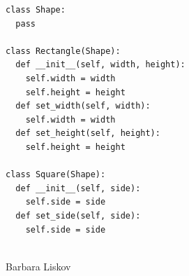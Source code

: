 \documentclass[calcdimensions,landscape,letterpaper]{powersem}
\newcommand{\thecurrentheading}{}
\newcommand{\heading}[1]{\renewcommand{\thecurrentheading}{#1}}
\begin{document}
\begin{slide}
  \heading{Liskov-Substitution - After}
  \begin{center}
    \begin{minipage}[c]{.6\textwidth}
      \begin{verbatim}
class Shape:
  pass

class Rectangle(Shape):
  def __init__(self, width, height):
    self.width = width
    self.height = height
  def set_width(self, width):
    self.width = width
  def set_height(self, height):
    self.height = height

class Square(Shape):
  def __init__(self, side):
    self.side = side
  def set_side(self, side):
    self.side = side
      \end{verbatim}
    \end{minipage}
    \begin{minipage}[c]{.35\textwidth}
      \begin{center}
        \\
        Barbara Liskov
      \end{center}
    \end{minipage}
  \end{center}
\end{slide}
\end{document}
